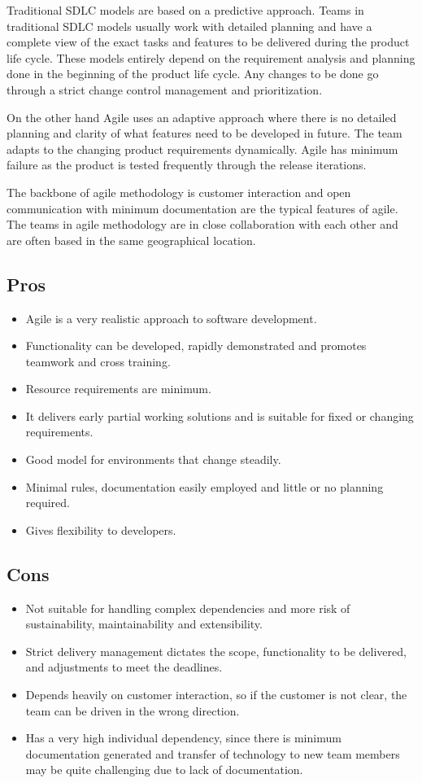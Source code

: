 Traditional SDLC models are based on a predictive approach. Teams in traditional SDLC models 
usually work with detailed planning and have a complete view of the exact tasks and features 
to be delivered during the product life cycle. These models entirely depend on the requirement 
analysis and planning done in the beginning of the product life cycle. Any changes to be done go 
through a strict change control management and prioritization.

On the other hand Agile uses an adaptive approach where there is no detailed planning and clarity
of what features need to be developed in future. The team adapts to the  changing product requirements 
dynamically. Agile has minimum failure as the product is tested frequently through the release iterations.

The backbone of agile methodology is customer interaction  and open communication with minimum 
documentation are the typical features of agile. The teams in agile methodology are in close collaboration 
with each other and are often based in the same geographical location.

\subsection{Pros}
\begin{itemize}
    \item Agile is a very realistic approach to software development.
    \item Functionality can be developed, rapidly demonstrated and promotes teamwork and cross training. 
    \item Resource requirements are minimum.
    \item It delivers early partial working solutions and is suitable for fixed or changing requirements.
    \item Good model for environments that change steadily.
    \item Minimal rules, documentation easily employed and little or no planning required.
    \item Gives flexibility to developers.
\end{itemize}

\subsection{Cons}
\begin{itemize}
    \item Not suitable for handling complex dependencies and more risk of sustainability, maintainability and extensibility.
    \item Strict delivery management dictates the scope, functionality to be delivered, and adjustments to meet the deadlines.
    \item Depends heavily on customer interaction, so if the customer is not clear, the team can be driven in the wrong direction.
    \item Has a very high individual dependency, since there is minimum documentation generated and transfer of technology to new 
    team members may be quite challenging due to lack of documentation.
\end{itemize}

